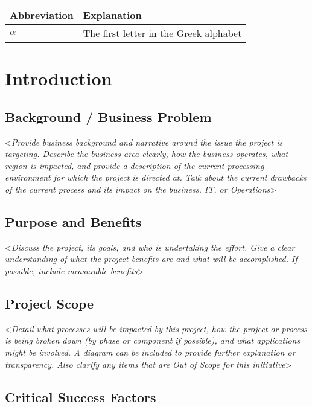 \documentclass[english,12pt]{scrartcl}
\newcommand{\comment}[1]{\textless\textit{#1}\textgreater\vspace*{1ex}}
\begin{document}
\begin{tabular}{p{}p{}} \toprule
Abbreviation &  Explanation \\ \midrule
$\alpha$ & The first letter in the Greek alphabet  \\ \bottomrule
\end{tabular}	
 
 
\section{Introduction}
 
\subsection{Background / Business Problem}
 
\comment{Provide business background and narrative around the issue the project is targeting.  Describe the business area clearly, how the business operates, what region is impacted, and provide a description of the current processing environment for which the project is directed at.  Talk about the current drawbacks of the current process and its impact on the business, IT, or Operations}
 
\subsection{Purpose and Benefits}
 
\comment{Discuss the project, its goals, and who is undertaking the effort.  Give a clear understanding of what the project benefits are and what will be accomplished.  If possible, include measurable benefits}
 
\subsection{Project Scope}
 
\comment{Detail what processes will be impacted by this project, how the project or process is being broken down (by phase or component if possible), and what applications might be involved.  A diagram can be included to provide further explanation or transparency.  Also clarify any items that are Out of Scope for this initiative}
 
\subsection{Critical Success Factors}
 
\end{document}
